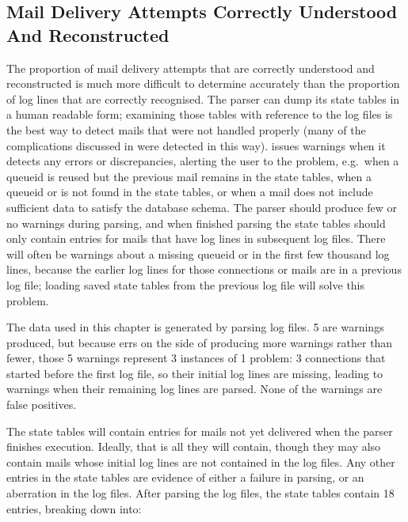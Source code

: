 \subsection{Mail Delivery Attempts Correctly Understood And Reconstructed}

\label{mails-covered}

The proportion of mail delivery attempts that are correctly understood and
reconstructed is much more difficult to determine accurately than the
proportion of log lines that are correctly recognised.  The parser can dump
its state tables in a human readable form; examining those tables with
reference to the log files is the best way to detect mails that were not
handled properly (many of the complications discussed in
 were detected in this way).  \parsername{}
issues warnings when it detects any errors or discrepancies, alerting the
user to the problem, e.g.\ when a queueid is reused but the previous mail
remains in the state tables, when a queueid or  is not found
in the state tables, or when a mail does not include sufficient data to
satisfy the database schema.  The parser should produce few or no warnings
during parsing, and when finished parsing the state tables should only
contain entries for mails that have log lines in subsequent log files.
There will often be warnings about a missing queueid or  in
the first few thousand log lines, because the earlier log lines for those
connections or mails are in a previous log file; loading saved state tables
from the previous log file will solve this problem.

The data used in this chapter is generated by parsing \numberOFlogFILES{}
log files.  5 are warnings produced, but because \parsername{} errs on the
side of producing more warnings rather than fewer, those 5 warnings
represent 3 instances of 1 problem: 3 connections that started before the
first log file, so their initial log lines are missing, leading to warnings
when their remaining log lines are parsed.  None of the warnings are false
positives.

The state tables will contain entries for mails not yet delivered when the
parser finishes execution.  Ideally, that is all they will contain, though
they may also contain mails whose initial log lines are not contained in
the log files.  Any other entries in the state tables are evidence of
either a failure in parsing, or an aberration in the log files.  After
parsing the \numberOFlogFILES{} log files, the state tables contain 18
entries, breaking down into:

